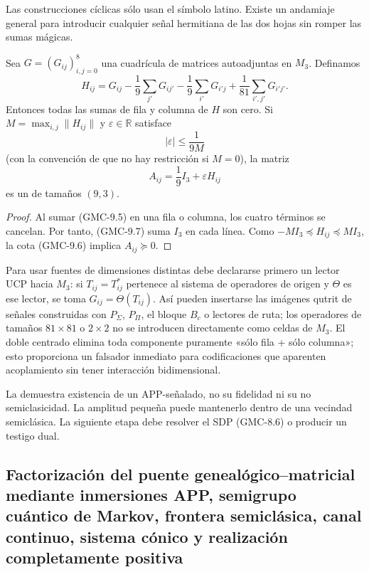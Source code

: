 Las construcciones cíclicas sólo usan el símbolo latino. Existe un andamiaje
general para introducir cualquier señal hermitiana de las dos hojas sin
romper las sumas mágicas.

\begin{proposition}
\label{gmc:prop:doble-centrado}
Sea $G=(G_{ij})_{i,j=0}^{8}$ una cuadrícula de matrices autoadjuntas en
$M_3$. Definamos
\[
 H_{ij}=G_{ij}
 -\frac19\sum_{j'}G_{ij'}
 -\frac19\sum_{i'}G_{i'j}
 +\frac1{81}\sum_{i',j'}G_{i'j'}.
 \tag{GMC-9.5}
\]
Entonces todas las sumas de fila y columna de $H$ son cero. Si
$M=\max_{i,j}\|H_{ij}\|$ y $\varepsilon\in\mathbb R$ satisface
\[
 |\varepsilon|\le\frac1{9M}
 \tag{GMC-9.6}
\]
(con la convención de que no hay restricción si $M=0$), la matriz
\[
 A_{ij}=\frac19I_3+\varepsilon H_{ij}
 \tag{GMC-9.7}
\]
es un \QMS de tamaños $(9,3)$.
\end{proposition}

\begin{proof}
Al sumar \textup{(GMC-9.5)} en una fila o columna, los cuatro términos se cancelan.
Por tanto, \textup{(GMC-9.7)} suma $I_3$ en cada línea. Como
$-MI_3\preceq H_{ij}\preceq MI_3$, la cota \textup{(GMC-9.6)} implica
$A_{ij}\succeq0$.
\end{proof}

Para usar fuentes de dimensiones distintas debe declararse primero un lector
UCP hacia $M_3$: si $T_{ij}=T_{ij}^*$ pertenece al sistema de operadores de
origen y $\Theta$ es ese lector, se toma $G_{ij}=\Theta(T_{ij})$. Así pueden
insertarse las imágenes qutrit de señales construidas con $P_\Sigma$,
$P_\Pi$, el bloque $B_c$ o lectores de ruta; los operadores de tamaños
$81\times81$ o $2\times2$ no se introducen directamente como celdas de
$M_3$. El doble centrado
elimina toda componente puramente «sólo fila + sólo columna»; esto proporciona
un falsador inmediato para codificaciones que aparenten acoplamiento sin
tener interacción bidimensional.

\begin{controlbox}
La  demuestra existencia de un \QMS APP-señalado,
no su fidelidad ni su no semiclasicidad. La amplitud pequeña puede mantenerlo
dentro de una vecindad semiclásica. La siguiente etapa debe resolver el SDP
\textup{(GMC-8.6)} o producir un testigo dual.
\end{controlbox}

\subsection{Factorización del puente genealógico--matricial mediante inmersiones APP, semigrupo cuántico de Markov, frontera semiclásica, canal continuo, sistema cónico y realización completamente positiva}

